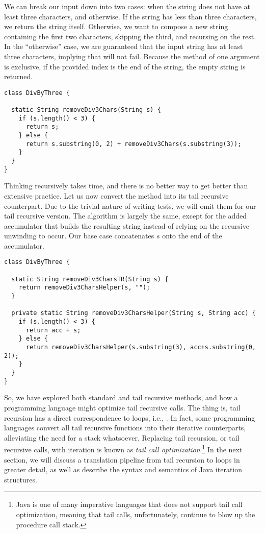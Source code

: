 We can break our input down into two cases: when the string does not have at least three characters, and otherwise. If the string has less than three characters, we return the string itself. Otherwise, we want to compose a new string containing the first two characters, skipping the third, and recursing on the rest. In the ``otherwise'' case, we are guaranteed that the input string has at least three characters, implying that  will not fail. Because the  method of one argument is exclusive, if the provided index is the end of the string, the empty string is returned.

\begin{lstlisting}[language=MyJava]
class DivByThree {

  static String removeDiv3Chars(String s) {
    if (s.length() < 3) {
      return s;
    } else {
      return s.substring(0, 2) + removeDiv3Chars(s.substring(3));
    }
  }
}
\end{lstlisting}
Thinking recursively takes time, and there is no better way to get better than extensive practice. Let us now convert the method into its tail recursive counterpart. Due to the trivial nature of writing tests, we will omit them for our tail recursive version. The algorithm is largely the same, except for the added accumulator that builds the resulting string instead of relying on the recursive unwinding to occur. Our base case concatenates $s$ onto the end of the accumulator.

\enlargethispage{5\baselineskip}
\begin{lstlisting}[language=MyJava]
class DivByThree {

  static String removeDiv3CharsTR(String s) {
    return removeDiv3CharsHelper(s, "");
  }

  private static String removeDiv3CharsHelper(String s, String acc) {
    if (s.length() < 3) {
      return acc + s;
    } else {
      return removeDiv3CharsHelper(s.substring(3), acc+s.substring(0, 2));
    }
  }
}
\end{lstlisting}

So, we have explored both standard and tail recursive methods, and how a programming language might optimize tail recursive calls. The thing is, tail recursion has a direct correspondence to loops, i.e., . In fact, some programming languages convert all tail recursive functions into their iterative counterparts, alleviating the need for a stack whatsoever. Replacing tail recursion, or tail recursive calls, with iteration is known as \emph{tail call optimization}.\footnote{Java is one of many imperative languages that does not support tail call optimization, meaning that tail calls, unfortunately, continue to blow up the procedure call stack.} In the next section, we will discuss a translation pipeline from tail recursion to loops in greater detail, as well as describe the syntax and semantics of Java iteration structures.

